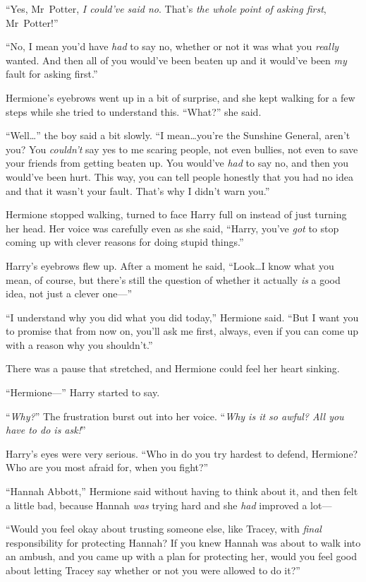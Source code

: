 “Yes, Mr~Potter, \emph{I could’ve said no}. That’s \emph{the whole point of asking first}, Mr~Potter!”

“No, I mean you’d have \emph{had} to say no, whether or not it was what you \emph{really} wanted. And then all of you would’ve been beaten up and it would’ve been \emph{my} fault for asking first.”

Hermione’s eyebrows went up in a bit of surprise, and she kept walking for a few steps while she tried to understand this.
“What?” she said.

“Well…” the boy said a bit slowly.
“I mean…you’re the Sunshine General, aren’t you? You \emph{couldn’t} say yes to me scaring people, not even bullies, not even to save your friends from getting beaten up. You would’ve \emph{had} to say no, and then you would’ve been hurt. This way, you can tell people honestly that you had no idea and that it wasn’t your fault. That’s why I didn’t warn you.”

Hermione stopped walking, turned to face Harry full on instead of just turning her head. Her voice was carefully even as she said,
“Harry, you’ve \emph{got} to stop coming up with clever reasons for doing stupid things.”

Harry’s eyebrows flew up. After a moment he said,
“Look…I know what you mean, of course, but there’s still the question of whether it actually \emph{is} a good idea, not just a clever one—”

“I understand why you did what you did today,” Hermione said.
“But I want you to promise that from now on, you’ll ask me first, always, even if you can come up with a reason why you shouldn’t.”

There was a pause that stretched, and Hermione could feel her heart sinking.

“Hermione—” Harry started to say.

“\emph{Why?}” The frustration burst out into her voice. “\emph{Why is it so awful? All you have to do is ask!}”

Harry’s eyes were very serious.
“Who in \SPHEW do you try hardest to defend, Hermione? Who are you most afraid for, when you fight?”

“Hannah Abbott,” Hermione said without having to think about it, and then felt a little bad, because Hannah \emph{was} trying hard and she \emph{had} improved a lot—

“Would you feel okay about trusting someone else, like Tracey, with \emph{final} responsibility for protecting Hannah? If you knew Hannah was about to walk into an ambush, and you came up with a plan for protecting her, would you feel good about letting Tracey say whether or not you were allowed to do it?”

